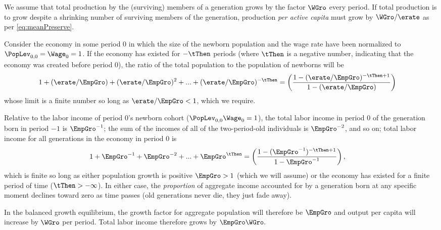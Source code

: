 \documentclass{\handout}
\begin{document}
We assume that total production by the (surviving) members of a generation grows by
the factor $\WGro$ every period.  If total production is to grow
despite a shrinking number of surviving members of the generation, 
production {\it per active capita} must grow by $\WGro/\erate$ as per \eqref{eq:meanPreserve}.

Consider the economy in some period 0 in which the size of the newborn population
and the wage rate have been normalized to $\PopLev_{0,0} = \Wage_{0} = 1$.  If the economy
has existed for $-\tThen$ periods (where $\tThen$ is a negative number, indicating that the economy was created before period 0), the ratio of the total population to the population
of newborns will be 
\begin{equation}\begin{gathered}\begin{aligned}
  1 + (\erate/\EmpGro)+ (\erate/\EmpGro)^{2}+ ... +(\erate/\EmpGro)^{-\tThen} & =  \left(\frac{1-(\erate/\EmpGro)^{-\tThen+1}}{1-(\erate/\EmpGro)}\right)
\end{aligned}\end{gathered}\end{equation}
whose limit is a finite number so long as $\erate/\EmpGro < 1$, which we require.

Relative to the labor income of period 0's newborn cohort ($\PopLev_{0,0} \Wage_{0} = 1$),
the total labor income in period 0 of the generation born in period $-1$ is $\EmpGro^{-1}$; the sum of the incomes of all of the two-period-old individuals is $\EmpGro^{-2}$, and so on; total labor income for all generations in the economy in period 0 is
\begin{equation}\begin{gathered}\begin{aligned}
  1 + \EmpGro^{-1}+ \EmpGro^{-2}+ ...+\EmpGro^{\tThen} & =  \left(\frac{1-(\EmpGro^{-1})^{-\tThen+1}}{1-\EmpGro^{-1}}\right) \label{eq:LabIncTot}
,
\end{aligned}\end{gathered}\end{equation}
which is finite so long as either population growth is positive $\EmpGro>1$ (which 
we will assume) or 
the economy has existed for a finite period of time ($\tThen > -\infty$).  
In either case, the {\it proportion} of aggregate income accounted for by a generation
born at any specific moment declines toward zero as time passes (old generations never die,
they just fade away).

In the balanced growth equilibrium, the growth factor for aggregate population
will therefore be $\EmpGro$ and output per capita will increase by $\WGro$ per period.  Total
labor income therefore grows by $\EmpGro \WGro.$
\end{document}
